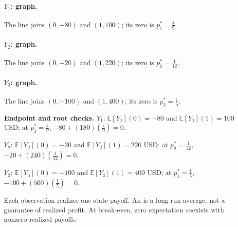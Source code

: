 \paragraph{$Y_1$: graph.}
\begin{center}\end{center}
The line joins $(0,-80)$ and $(1,100)$; its zero is $p_1^*=\frac{4}{9}$.
\clearpage
{}\paragraph{$Y_2$: graph.}
\begin{center}\end{center}
The line joins $(0,-20)$ and $(1,220)$; its zero is $p_2^*=\frac{1}{12}$.
\clearpage
{}\paragraph{$Y_3$: graph.}
\begin{center}\end{center}
The line joins $(0,-100)$ and $(1,400)$; its zero is $p_3^*=\frac{1}{5}$.

\textbf{Endpoint and root checks.} $Y_1$: $\mathbb E[Y_1](0)=-80$ and $\mathbb E[Y_1](1)=100$ USD; at $p_1^*=\frac{4}{9}$, $-80+(180)(\frac{4}{9})=0$.

$Y_2$: $\mathbb E[Y_2](0)=-20$ and $\mathbb E[Y_2](1)=220$ USD; at $p_2^*=\frac{1}{12}$, $-20+(240)(\frac{1}{12})=0$.

$Y_3$: $\mathbb E[Y_3](0)=-100$ and $\mathbb E[Y_3](1)=400$ USD; at $p_3^*=\frac{1}{5}$, $-100+(500)(\frac{1}{5})=0$.

Each observation realizes one state payoff. An  is a long-run average,
not a guarantee of realized profit. At break-even, zero expectation coexists with nonzero realized payoffs.
\clearpage

